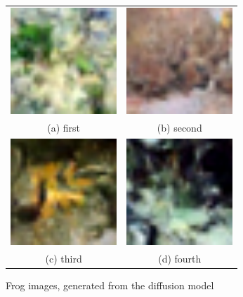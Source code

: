 \documentclass[conference]{IEEEtran}
\begin{document}
          \begin{figure}
            \begin{tabular}{cc}
              \includegraphics[width=40mm]{./images/generated-imgs/frog/0612.png} 
          &   \includegraphics[width=40mm]{./images/generated-imgs/frog/0613.png} 
          \\
            (a) first 
            & (b) second \\[6pt]
               \includegraphics[width=40mm]{./images/generated-imgs/frog/0614.png} 
            &  \includegraphics[width=40mm]{./images/generated-imgs/frog/0615.png} 
          \\
            (c) third & (d) fourth \\[6pt]
            \end{tabular}
            \caption{Frog images, generated from the diffusion model}
            \end{figure}
        
\end{document}
